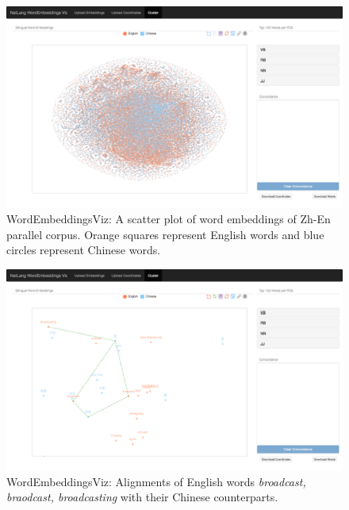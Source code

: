 \begin{figure}[htbp]
	\begin{center}
		\includegraphics[width=\textwidth]{files/images/viz7}
	\end{center}
	\caption{WordEmbeddingsViz: A scatter plot of word embeddings of Zh-En parallel corpus. Orange squares represent English words and blue circles represent Chinese words.}
	\label{fig:viz2}
\end{figure}

\begin{figure}[htbp]
	\begin{center}
		\includegraphics[width=\textwidth]{files/images/viz6}
	\end{center}
	\caption{WordEmbeddingsViz: Alignments of English words \textit{broadcast, braodcast, broadcasting} with their Chinese counterparts.}
	\label{fig:viz3}
\end{figure}

